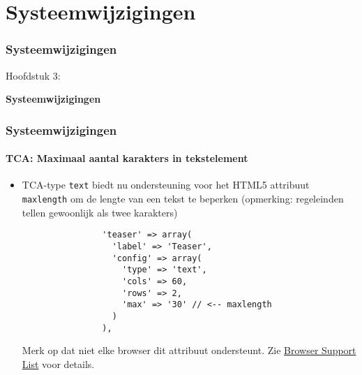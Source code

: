 %

\section{Systeemwijzigingen}
\begin{frame}[fragile]
	\frametitle{Systeemwijzigingen}

	\begin{center}\huge{Hoofdstuk 3:}\end{center}
	\begin{center}\huge{\color{typo3darkgrey}\textbf{Systeemwijzigingen}}\end{center}

\end{frame}


\begin{frame}[fragile]
	\frametitle{Systeemwijzigingen}
	\framesubtitle{TCA: Maximaal aantal karakters in tekstelement}

	\begin{itemize}
		\item TCA-type \texttt{text} biedt nu ondersteuning voor het HTML5 attribuut \texttt{maxlength}
			om de lengte van een tekst te beperken (opmerking: regeleinden tellen gewoonlijk als twee karakters)

			\begin{lstlisting}
				'teaser' => array(
				  'label' => 'Teaser',
				  'config' => array(
				    'type' => 'text',
				    'cols' => 60,
				    'rows' => 2,
				    'max' => '30' // <-- maxlength
				  )
				),
			\end{lstlisting}

			Merk op dat niet elke browser dit attribuut ondersteunt.\newline
			Zie \href{http://www.w3schools.com/tags/att_textarea_maxlength.asp}{Browser Support List} voor details.

	\end{itemize}

\end{frame}

